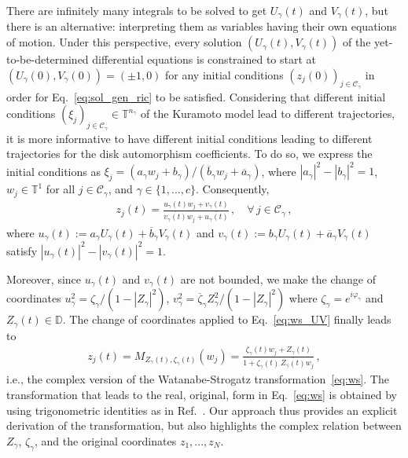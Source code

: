 \documentclass[aps,pre,reprint,longbibliography,superscriptaddress,noshowpacs,floatfix]{revtex4-2}
\theoremstyle{definition}
\theoremstyle{remark}
\begin{document}
There are infinitely many integrals to be solved to get $U_{\gamma}(t)$ and $V_{\gamma}(t)$, but there is an alternative: interpreting them as variables having their own equations of motion. Under this perspective, every solution $(U_{\gamma}(t), V_{\gamma}(t))$ of the yet-to-be-determined differential equations is constrained to start at $(U_{\gamma}(0), V_{\gamma}(0)) = (\pm 1, 0)$ for any initial conditions $(z_j(0))_{j\in \mathcal{C}_\gamma}$ in order for Eq.~\eqref{eq:sol_gen_ric} to be satisfied. Considering that different initial conditions $(\xi_j)_{j\in \mathcal{C}_\gamma}\in \mathbb{T}^{n_{\gamma}}$ of the Kuramoto model lead to different trajectories, it is more informative to have different initial conditions leading to different trajectories for the disk automorphism coefficients. To do so, we express the initial conditions as $\xi_j = (a_{\gamma}w_j + b_{\gamma})/(\overline{b}_{\gamma}w_j + \overline{a}_{\gamma})$, where $|a_{\gamma}|^2 - |b_{\gamma}|^2 = 1$,  $w_j \in \mathbb{T}^1$ for all $j\in \mathcal{C}_\gamma$, and $\gamma\in\{1,...,c\}$. Consequently, 
\begin{align}\label{eq:ws_UV}
    z_j(t) = \frac{u_{\gamma}(t)w_j + v_{\gamma}(t)}{\overline{v_{\gamma}(t)}w_j + \overline{u_{\gamma}(t)}}\,,\quad \forall \,j\in \mathcal{C}_\gamma\,,
\end{align}
where $u_{\gamma}(t) := a_{\gamma}U_{\gamma}(t) + \overline{b}_{\gamma}V_{\gamma}(t)$ and $v_{\gamma}(t) := b_{\gamma}U_{\gamma}(t) + \overline{a}_{\gamma}V_{\gamma}(t)$ satisfy $|u_{\gamma}(t)|^2 - |v_{\gamma}(t)|^2 = 1$. 

Moreover, since $u_{\gamma}(t)$ and $v_{\gamma}(t)$ are not bounded, we make the change of coordinates $u_{\gamma}^2 = \zeta_{\gamma}/(1 - |Z_{\gamma}|^2)$, $v_{\gamma}^2 = \overline{\zeta}_{\gamma}Z_{\gamma}^2/(1 - |Z_{\gamma}|^2)$ where $\zeta_{\gamma} = e^{i\varphi_\gamma}$ and $Z_{\gamma}(t) \in \mathbb{D}$. The change of coordinates applied to Eq.~\eqref{eq:ws_UV} finally leads to 
\begin{align}\label{eq:auto_ric}
    z_j(t) = M_{Z_{\gamma}(t), \zeta_{\gamma}(t)}(w_j) = \frac{\zeta_{\gamma}(t)w_j + Z_{\gamma}(t)}{1 + \zeta_{\gamma}(t)\,\overline{Z_{\gamma}(t)}w_j}\,,
\end{align}
i.e., the complex version of the Watanabe-Strogatz transformation~\eqref{eq:ws}. The transformation that leads to the real, original, form in Eq.~\eqref{eq:ws} is obtained by using trigonometric identities as in Ref.~\cite[IV, A]{Marvel2009}. Our approach thus provides an explicit derivation of the transformation, but also highlights the complex relation between $Z_{\gamma}$, $\zeta_{\gamma}$, and the original coordinates $z_1, ..., z_N$. %
\end{document}
